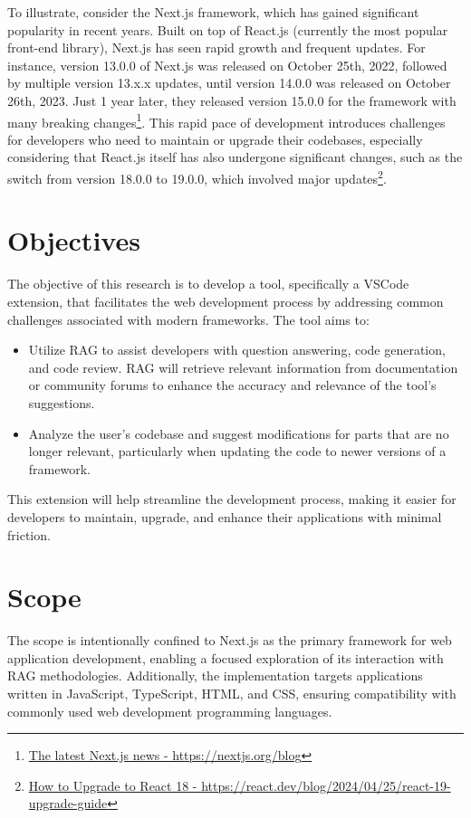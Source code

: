 To illustrate, consider the Next.js framework, which has gained significant popularity in recent years. Built on top of React.js (currently the most popular front-end library), Next.js has seen rapid growth and frequent updates. For instance, version 13.0.0 of Next.js was released on October 25th, 2022, followed by multiple version 13.x.x updates, until version 14.0.0 was released on October 26th, 2023. Just 1 year later, they released version 15.0.0 for the framework with many breaking changes\footnote{\href{https://nextjs.org/blog}{The latest Next.js news - https://nextjs.org/blog}}. This rapid pace of development introduces challenges for developers who need to maintain or upgrade their codebases, especially considering that React.js itself has also undergone significant changes, such as the switch from version 18.0.0 to 19.0.0, which involved major updates\footnote{\href{https://react.dev/blog/2024/04/25/react-19-upgrade-guide}{How to Upgrade to React 18 - https://react.dev/blog/2024/04/25/react-19-upgrade-guide}}.

\section{Objectives}

The objective of this research is to develop a tool, specifically a VSCode extension, that facilitates the web development process by addressing common challenges associated with modern frameworks. The tool aims to:

\begin{itemize}
  \item Utilize RAG to assist developers with question answering, code generation, and code review. RAG will retrieve relevant information from documentation or community forums to enhance the accuracy and relevance of the tool's suggestions.
  \item Analyze the user's codebase and suggest modifications for parts that are no longer relevant, particularly when updating the code to newer versions of a framework.
\end{itemize}

This extension will help streamline the development process, making it easier for developers to maintain, upgrade, and enhance their applications with minimal friction.

\section{Scope}
The scope is intentionally confined to Next.js as the primary framework for web application development, enabling a focused exploration of its interaction with RAG methodologies. Additionally, the implementation targets applications written in JavaScript, TypeScript, HTML, and CSS, ensuring compatibility with commonly used web development programming languages.


